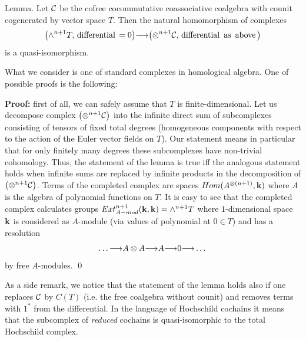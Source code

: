               
            
            \proclaim Lemma. Let ${\cal C}$ be the
             cofree cocommutative coassociative
             coalgebra with counit cogenerated by vector space $T$. 
             Then the natural 
              homomorphism of complexes
              $$\bigl(\wedge ^{n+1} T,\,{\rm differential\,}=0\bigr)
              {\longrightarrow} \bigl(\otimes ^{n+1} {\cal C},\,{\rm differential\,\,\,
              as\,\,\,above\,}\bigr)$$
              is a quasi-isomorphism. \par
              
              What we consider is one
             of standard complexes in homological algebra. One of possible
              proofs is the
              following:
              
            {\bf Proof:} first of all, we can safely assume that
             $T$ is finite-dimensional. 
             Let us decompose complex $\bigl(\otimes ^{n+1} 
              {\cal C}\bigr)$
               into the infinite direct sum of subcomplexes consisting 
               of tensors
                of fixed total degrees
                 (homogeneous components with respect to the action
                  of the Euler vector fields on $T$). Our statement 
                  means in particular
              that for only finitely many
                 degrees these subcomplexes have non-trivial cohomology. 
                 Thus,
                   the statement of the lemma is true iff the analogous 
                   statement
                    holds when infinite sums  are replaced by infinite 
                    products
                    in the decomposition
                     of $\bigl(\otimes ^{n+1} {\cal C}\bigr)$. Terms of the 
                     completed complex
                      are spaces  $Hom(A^{\otimes (n+1)},{\bf k})$ where $A$ 
                      is the algebra
                       of polynomial functions on $T$. It is easy to see 
                       that the 
                        completed complex calculates groups 
                        $Ext^{n+1}_{A-mod}({\bf k},{\bf k})
                    = \wedge^{n+1} T$ where $1$-dimensional space 
                    ${\bf k}$ is
                     considered as $A$-module (via values of polynomial at 
                     $0\in T$) and has
                     a resolution 
                     $$\dots{\longrightarrow} A\otimes A{\longrightarrow} A{\longrightarrow} 0{\longrightarrow}\dots$$
            by free $A$-modules. \qed
            
            As a side remark, we notice that the statement of the lemma 
            holds also
             if one replaces ${\cal C}$ by $C(T)$ (i.e. the free coalgebra without 
             counit) and removes terms with $1^*$ from the differential.
              In the language of Hochschild cochains it means that the 
              subcomplex of
               {\it reduced} cochains is quasi-isomorphic to the total 
               Hochschild complex.
               
